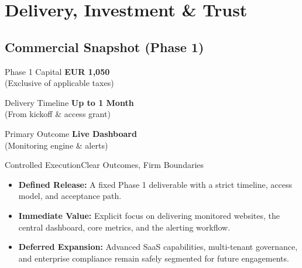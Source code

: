 \documentclass[11pt,a4paper]{article}
\begin{document}
\section{Delivery, Investment \& Trust}

\subsection{Commercial Snapshot (Phase 1)}
\vspace{0.5em}
\begin{center}
\begin{valuecard}{Phase 1 Capital}
\textbf{EUR 1,050}\\[4pt]
\textcolor{softgray}{\fontsize{8}{10}\selectfont (Exclusive of applicable taxes)}
\end{valuecard}
\hfill
\begin{valuecard}{Delivery Timeline}
\textbf{Up to 1 Month}\\[4pt]
\textcolor{softgray}{\fontsize{8}{10}\selectfont (From kickoff \& access grant)}
\end{valuecard}
\hfill
\begin{valuecard}{Primary Outcome}
\textbf{Live Dashboard}\\[4pt]
\textcolor{softgray}{\fontsize{8}{10}\selectfont (Monitoring engine \& alerts)}
\end{valuecard}
\end{center}
\vspace{1.5em}

\begin{recbox}{Controlled Execution}{Clear Outcomes, Firm Boundaries}
\begin{itemize}
  \item \textbf{Defined Release:} A fixed Phase 1 deliverable with a strict timeline, access model, and acceptance path.
  \item \textbf{Immediate Value:} Explicit focus on delivering monitored websites, the central dashboard, core metrics, and the alerting workflow.
  \item \textbf{Deferred Expansion:} Advanced SaaS capabilities, multi-tenant governance, and enterprise compliance remain safely segmented for future engagements.
\end{itemize}
\end{recbox}

\vspace{1em}
\end{document}
